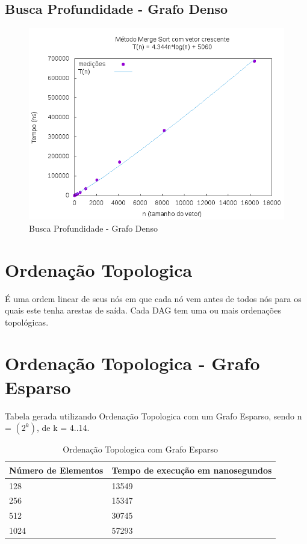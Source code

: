 \documentclass[12pt,a4paper,twoside]{report}
\begin{document}
\subsection{Busca Profundidade - Grafo Denso}
\begin{figure}[H]
    \centering
    \includegraphics[width=0.7\linewidth]{graficos/MergeSort/vIntCrescente/vIntCrescente.png}
  \caption{Busca Profundidade - Grafo Denso}
\end{figure}

\section{Ordenação Topologica}

 É uma ordem linear de seus nós em que cada nó vem antes de todos nós para os quais este tenha arestas de saída. Cada DAG tem uma ou mais ordenações topológicas.

\section{Ordenação Topologica - Grafo Esparso}
Tabela gerada utilizando Ordenação Topologica com um Grafo Esparso, sendo n = $(2^k)$, de k = 4..14.
\begin{table}[H]
\centering
\caption{Ordenação Topologica com Grafo Esparso}
\label{my-label}
\begin{tabular}{|l|l|}
\hline
\multicolumn{1}{|c|}{\textbf{Número de Elementos}} & \multicolumn{1}{c|}{\textbf{Tempo de execução em nanosegundos}} \\ \hline
128 & 13549 \\ \hline
256 & 15347 \\ \hline
512 & 30745 \\ \hline
1024 & 57293 \\ \hline
\end{tabular}
\end{table}
\end{document}
